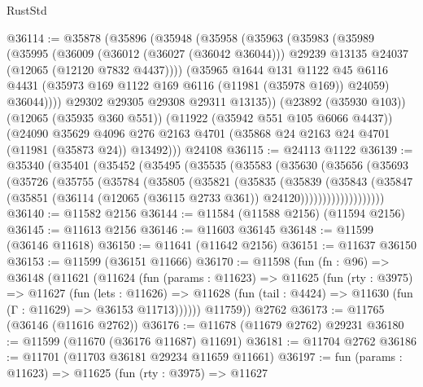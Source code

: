 \begin{lexlean}{RustStd}
\begin{coremodule}
@36114 := @35878
    (@35896
      (@35948
        (@35958
          (@35963
            (@35983
              (@35989
                (@35995
                  (@36009
                    (@36012 (@36027 (@36042 @36044)))
                    @29239
                    @13135
                    @24037
                    (@12065 (@12120 @7832 @4437))))
                (@35965
                  @1644
                  @131
                  @1122
                  @45
                  @6116
                  @4431
                  (@35973 @169 @1122 @169 @6116 (@11981 (@35978 @169)) @24059)
                  @36044))))
          @29302
          @29305
          @29308
          @29311
          @13135))
      (@23892 (@35930 @103))
      (@12065 (@35935 @360 @551))
      (@11922 (@35942 @551 @105 @6066 @4437))
      (@24090
        @35629
        @4096
        @276
        @2163
        @4701
        (@35868 @24 @2163 @24 @4701 (@11981 (@35873 @24)) @13492)))
    @24108
@36115 := @24113 @1122
@36139 := @35340
    (@35401
      (@35452
        (@35495
          (@35535
            (@35583
              (@35630
                (@35656
                  (@35693
                    (@35726
                      (@35755
                        (@35784
                          (@35805
                            (@35821
                              (@35835
                                (@35839
                                  (@35843
                                    (@35847
                                      (@35851
                                        (@36114
                                          (@12065 (@36115 @2733 @361))
                                          @24120)))))))))))))))))))
@36140 := @11582 @2156
@36144 := @11584 (@11588 @2156) (@11594 @2156)
@36145 := @11613 @2156
@36146 := @11603 @36145
@36148 := @11599 (@36146 @11618)
@36150 := @11641 (@11642 @2156)
@36151 := @11637 @36150
@36153 := @11599 (@36151 @11666)
@36170 := @11598
    (fun (fn : @96) =>
    @36148
      (@11621
        (@11624
          (fun (params : @11623) =>
          @11625
            (fun (rty : @3975) =>
            @11627
              (fun (lets : @11626) =>
              @11628 (fun (tail : @4424) => @11630 (fun (Γ : @11629) => @36153 @11713))))))
        @11759))
    @2762
@36173 := @11765 (@36146 (@11616 @2762))
@36176 := @11678 (@11679 @2762) @29231
@36180 := @11599 (@11670 (@36176 @11687) @11691)
@36181 := @11704 @2762
@36186 := @11701 (@11703 @36181 @29234 @11659 @11661)
@36197 := fun (params : @11623) =>
  @11625
    (fun (rty : @3975) =>
    @11627

\end{coremodule}
\end{lexlean}
